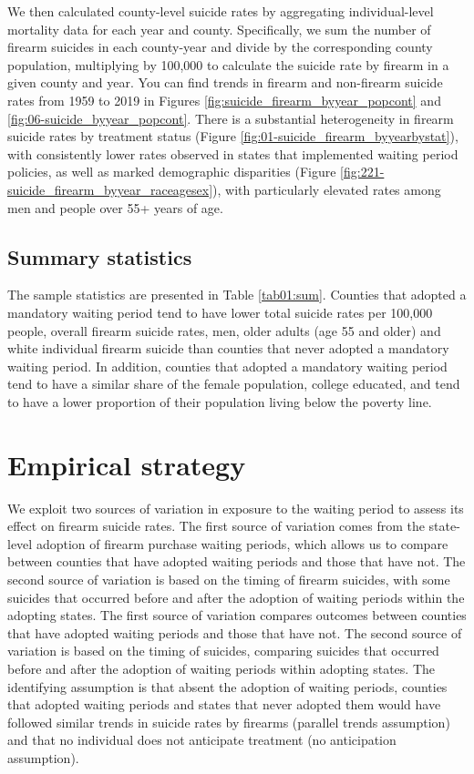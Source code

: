 We then calculated county-level suicide rates by aggregating individual-level mortality data for each year and county. Specifically, we sum the number of firearm suicides in each county-year and divide by the corresponding county population, multiplying by 100,000 to calculate the suicide rate by firearm in a given county and year. You can find trends in firearm and non-firearm suicide rates from 1959 to 2019 in Figures \ref{fig:suicide_firearm_byyear_popcont} and \ref{fig:06-suicide_byyear_popcont}.  There is a substantial heterogeneity in firearm suicide rates by treatment status (Figure \ref{fig:01-suicide_firearm_byyearbystat}), with consistently lower rates observed in states that implemented waiting period policies, as well as marked demographic disparities (Figure \ref{fig:221-suicide_firearm_byyear_raceagesex}), with particularly elevated rates among men and people over 55+ years of age. 

\subsection*{Summary statistics}

The sample statistics are presented in Table \ref{tab01:sum}. Counties that adopted a mandatory waiting period tend to have lower total suicide rates per 100,000 people, overall firearm suicide rates, men, older adults (age 55 and older) and white individual firearm suicide than counties that never adopted a mandatory waiting period. In addition, counties that adopted a mandatory waiting period tend to have a similar share of the female population, college educated, and tend to have a lower proportion of their population living below the poverty line. 

\section{Empirical strategy} \label{sec:emp-model}

We exploit two sources of variation in exposure to the waiting period to assess its effect on firearm suicide rates.  The first source of variation comes from the state-level adoption of firearm purchase waiting periods, which allows us to compare between counties that have adopted waiting periods and those that have not. The second source of variation is based on the timing of firearm suicides, with some suicides that occurred before and after the adoption of waiting periods within the adopting states. The first source of variation compares outcomes between counties that have adopted waiting periods and those that have not. The second source of variation is based on the timing of suicides, comparing suicides that occurred before and after the adoption of waiting periods within adopting states. The identifying assumption is that absent the adoption of waiting periods, counties that adopted waiting periods and states that never adopted them would have followed similar trends in suicide rates by firearms (parallel trends assumption) and that no individual does not anticipate treatment (no anticipation assumption). \\

